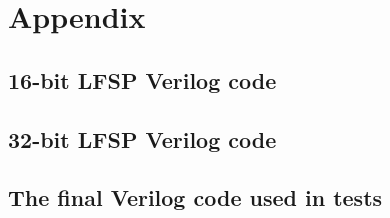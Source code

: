 \documentclass[conference]{IEEEtran}
\begin{document}
\section{Appendix}
\subsection{16-bit LFSP Verilog code}


\thispagestyle{empty} 

\subsection{32-bit LFSP Verilog code}


\subsection{The final Verilog code used in tests }


\clearpage
\end{document}
